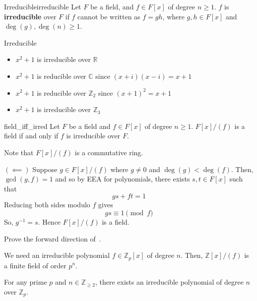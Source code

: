 
\begin{Definition}{Irreducible}{irreducible}
    Let $ F $ be a field, and $ f\in F[x] $ of degree $ n\geqslant 1 $.
    $ f $ is \textbf{irreducible} over $ F $ if $ f $ cannot be written
    as $ f=gh $, where $ g,h\in F[x] $ and $ \deg(g),\deg(n)\geqslant 1 $.
\end{Definition}

\begin{Example}{Irreducible}{}
    \begin{itemize}
        \item $ x^2+1 $ is irreducible over $ \mathbb{R} $
        \item $ x^2+1 $ is reducible over $ \mathbb{C} $ since $ (x+i)(x-i)=x+1 $
        \item $ x^2+1 $ is reducible over $ \mathbb{Z}_2 $ since $ (x+1)^2=x+1 $
        \item $ x^2+1 $ is irreducible over $ \mathbb{Z}_3 $
    \end{itemize}
\end{Example}

\begin{Theorem}{}{field_iff_irred}
    Let $ F $ be a field and $ f\in F[x] $ of degree $ n\geqslant 1 $.
    $ F[x]/(f) $ is a field if and only if $ f $ is irreducible over $ F $.
\end{Theorem}

\begin{Proof}{}{}
    Note that $ F[x]/(f) $ is a commutative ring.

    $ (\impliedby) $ Suppose $ g\in F[x]/(f) $ where $ g\neq 0 $
    and $ \deg(g)<\deg(f) $. Then, $ \gcd(g,f)=1 $ and so by EEA
    for polynomials, there exists $ s,t\in F[x] $ such that
    \[ gs+ft=1 \]
    Reducing both sides modulo $ f $ gives
    \[ gs\equiv 1 \pmod{f} \]
    So, $ g^{-1}=s $. Hence $ F[x]/(f) $ is a field.
\end{Proof}

\begin{Exercise}{}{}
    Prove the forward direction of~.
\end{Exercise}

We need an irreducible polynomial $ f\in\mathbb{Z}_p[x] $ of degree $ n $.
Then, $ \mathbb{Z}[x]/(f) $ is a finite field of order $ p^n $.

\begin{Theorem}{}{}
    For any prime $ p $ and $ n\in\mathbb{Z}_{\geqslant 2} $, there exists
    an irreducible polynomial of degree $ n $ over $ \mathbb{Z}_p $.
\end{Theorem}

